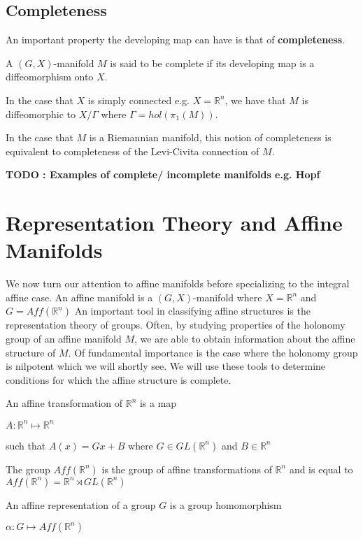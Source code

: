 \subsection{Completeness}
An important property the developing map can have is that of
\textbf{completeness}.
\begin{definition}
    A $(G,X)$-manifold $M$ is said to be complete if its developing map is a diffeomorphism
    onto $X$.
\end{definition}
In the case that $X$ is simply connected e.g. $X= \mathbb{R}^n$, we have that $M$ is diffeomorphic
to $X/\Gamma$ where $\Gamma = hol(\pi_1(M))$.

In the case that $M$ is a Riemannian manifold, this notion of completeness is
equivalent to completeness of the Levi-Civita connection of $M$.

\textbf{TODO :
    Examples of complete/ incomplete manifolds e.g. Hopf}
\section{Representation Theory and Affine Manifolds}
We now turn our attention to affine manifolds before specializing to the
integral affine case. An affine manifold is a $(G,X)$-manifold where $X =
    \mathbb{R}^n$ and $G = Aff(\mathbb{R}^n)$ An important tool in classifying
affine structures is the representation theory of groups. Often, by studying
properties of the holonomy group of an affine manifold $M$, we are able to
obtain information about the affine structure of $M$. Of fundamental importance
is the case where the holonomy group is nilpotent which we will shortly see. We
will use these tools to determine conditions for which the affine structure is
complete.

\begin{definition}
    An affine transformation of $\mathbb{R}^n$ is a map
    \begin{center}
        $A: \mathbb{R}^n \mapsto \mathbb{R}^n$
    \end{center}
    such that $A(x) = Gx + B$ where $G \in GL(\mathbb{R}^n)$ and $B \in\mathbb{R}^n$
\end{definition}

The group $Aff(\mathbb{R}^n)$ is the group of affine transformations of
$\mathbb{R}^n$ and is equal to $Aff(\mathbb{R}^n) = \mathbb{R}^n \rtimes
    GL(\mathbb{R}^n )$

\begin{definition}
    An affine representation of a group $G$ is a group homomorphism
    \begin{center}
        $\alpha: G \mapsto Aff(\mathbb{R}^n)$
    \end{center}
\end{definition}

